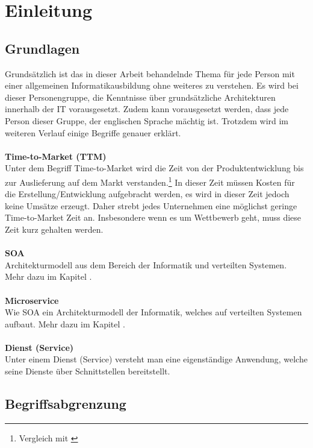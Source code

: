 \chapter{Einleitung}
\label{chap:einleitung}

\section{Grundlagen}
\label{sec:Grundlagen}
Grundsätzlich ist das in dieser Arbeit behandelnde Thema für jede Person mit einer allgemeinen Informatikausbildung ohne weiteres zu verstehen. Es wird bei dieser Personengruppe, die Kenntnisse über grundsätzliche Architekturen innerhalb der IT vorausgesetzt. Zudem kann vorausgesetzt werden, dass jede Person dieser Gruppe, der englischen Sprache mächtig ist. Trotzdem wird im weiteren Verlauf einige Begriffe genauer erklärt.
\\\\
\textbf{Time-to-Market (TTM)}\\
Unter dem Begriff Time-to-Market wird die Zeit von der Produktentwicklung bis zur Auslieferung auf dem Markt verstanden.\footnote{Vergleich mit \cite{ttm:BusinessDictionary}}  In dieser Zeit müssen Kosten für die Erstellung/Entwicklung aufgebracht werden, es wird in dieser Zeit jedoch keine Umsätze erzeugt. Daher strebt jedes Unternehmen eine möglichst geringe Time-to-Market Zeit an. Insbesondere wenn es um Wettbewerb geht, muss diese Zeit kurz gehalten werden.
\\\\    
\textbf{SOA}\\
Architekturmodell aus dem Bereich der Informatik und verteilten Systemen. Mehr dazu im Kapitel .
\\\\
\textbf{Microservice}\\
Wie SOA ein Architekturmodell der Informatik, welches auf verteilten Systemen aufbaut. Mehr dazu im Kapitel .
\\\\    
\textbf{Dienst (Service)}\\
Unter einem Dienst (Service) versteht man eine eigenständige Anwendung, welche seine Dienste über Schnittstellen bereitstellt.

\section{Begriffsabgrenzung}
\label{sec:Begriffsabgrenzung}

